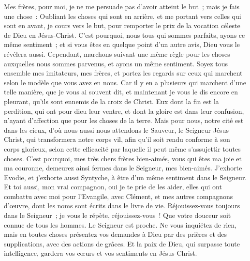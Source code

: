 \begin{multicols}{2}
Mes frères, pour moi, je ne me persuade pas d'avoir atteint le but~;
mais je fais une chose~: Oubliant les choses qui sont en arrière, et me portant vers celles qui sont en avant, je cours vers le but, pour remporter le prix de la vocation céleste de Dieu en Jésus-Christ.
C'est pourquoi, nous tous qui sommes parfaits, ayons ce même sentiment~; et si vous êtes en quelque point d'un autre avis, Dieu vous le révélera aussi.
Cependant, marchons suivant une même règle pour les choses auxquelles nous sommes parvenus, et ayons un même sentiment.
Soyez tous ensemble mes imitateurs, mes frères, et portez les regards sur ceux qui marchent selon le modèle que vous avez en nous.
Car il y en a plusieurs qui marchent d'une telle manière, que je vous ai souvent dit, et maintenant je vous le dis encore en pleurant, qu'ils sont ennemis de la croix de Christ. 
Eux dont la fin est la perdition, qui ont pour dieu leur ventre, et dont la gloire est dans leur confusion, n'ayant d'affection que pour les choses de la terre.
Mais pour nous, notre cité est dans les cieux, d'où nous aussi nous attendons le Sauveur, le Seigneur Jésus-Christ,
qui transformera notre corps vil, afin qu'il soit rendu conforme à son corps glorieux, selon cette efficacité par laquelle il peut même s'assujettir toutes choses. 
\VerseOne{}C'est pourquoi, mes très chers frères bien-aimés, vous qui êtes ma joie et ma couronne, demeurez ainsi fermes dans le Seigneur, mes bien-aimés.
J'exhorte Evodie, et j'exhorte aussi Syntyche, à être d'un même sentiment dans le Seigneur.
Et toi aussi, mon vrai compagnon, oui je te prie de les aider, elles qui ont combattu avec moi pour l'Evangile, avec Clément, et mes autres compagnons d'œuvre, dont les noms sont écrits dans le livre de vie.
Réjouissez-vous toujours dans le Seigneur~; je vous le répète, réjouissez-vous~!
Que votre douceur soit connue de tous les hommes. Le Seigneur est proche.
Ne vous inquiétez de rien, mais en toutes choses présentez vos demandes à Dieu par des prières et des supplications, avec des actions de grâces.
Et la paix de Dieu, qui surpasse toute intelligence, gardera vos cœurs et vos sentiments en Jésus-Christ.

\end{multicols}
